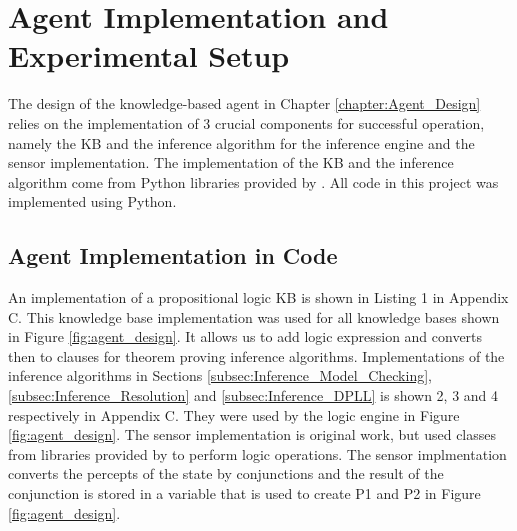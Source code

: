 






\chapter{Agent Implementation and Experimental Setup} 
\label{chapter: implementation_and_setup}

\vspace{-1cm}

The design of the knowledge-based agent in Chapter \ref{chapter:Agent_Design} relies on the implementation of 3 crucial components for successful operation, namely the KB and the inference algorithm for the inference engine and the sensor implementation. The implementation of the KB and the inference algorithm come from Python libraries provided by \citep{aima}. All code in this project was implemented using Python. 

\section{Agent Implementation in Code}
\label{sec:imp_code}

An implementation of a propositional logic KB is shown in Listing 1 in Appendix C. This knowledge base implementation was used for all knowledge bases shown in Figure \ref{fig:agent_design}. It allows us to add logic expression and converts then to clauses for theorem proving inference algorithms.
Implementations of the inference algorithms in Sections \ref{subsec:Inference_Model_Checking}, \ref{subsec:Inference_Resolution} and \ref{subsec:Inference_DPLL} is shown 2, 3 and 4 respectively in Appendix C. They were used by the logic engine in Figure \ref{fig:agent_design}. 
The sensor implementation is original work, but used classes from libraries provided by \citep{aima} to perform logic operations. The sensor implmentation converts the percepts of the state by conjunctions and the result of the conjunction is stored in a variable that is used to create P1 and P2 in Figure \ref{fig:agent_design}.



